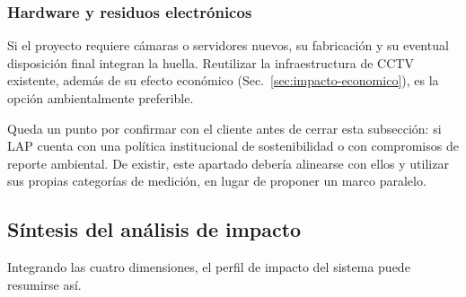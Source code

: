 
\subsubsection{Hardware y residuos electrónicos}

Si el proyecto requiere cámaras o servidores nuevos, su fabricación y su
eventual disposición final integran la huella. Reutilizar la
infraestructura de CCTV existente, además de su efecto económico
(Sec.~\ref{sec:impacto-economico}), es la opción ambientalmente
preferible.

Queda un punto por confirmar con el cliente antes de cerrar esta
subsección: si LAP cuenta con una política institucional de
sostenibilidad o con compromisos de reporte ambiental. De existir, este
apartado debería alinearse con ellos y utilizar sus propias categorías de
medición, en lugar de proponer un marco paralelo.

\subsection{Síntesis del análisis de impacto}
\label{sec:sintesis-impacto}

Integrando las cuatro dimensiones, el perfil de impacto del sistema puede
resumirse así.

